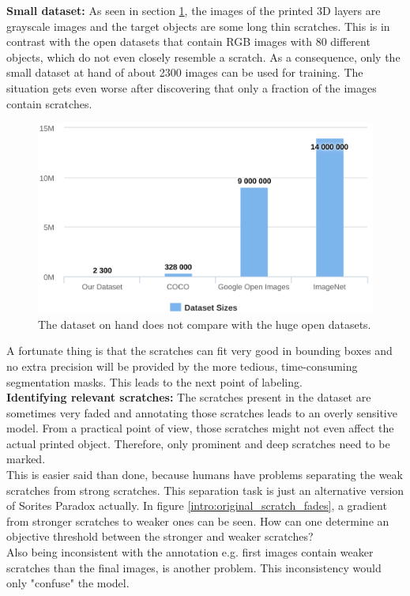 \textbf{Small dataset:}
As seen in section \ref{intro:dataset_sizes}, the images of the printed 3D layers are grayscale images and the target objects are some long thin scratches. This is in contrast with the open datasets that contain RGB images with 80 different objects, which do not even closely resemble a scratch. As a consequence, only the small dataset at hand of about 2300 images can be used for training. The situation gets even worse after discovering that only a fraction of the images contain scratches. \\
\begin{figure}[!h]
\centering
\includegraphics[width=0.4\columnwidth]{images/introduction/dataset_sizes}
\caption{The dataset on hand does not compare with the huge open datasets.}
\label{intro:dataset_sizes}
\end{figure}
A fortunate thing is that the scratches can fit very good in bounding boxes and no extra precision will be provided by the more tedious, time-consuming segmentation masks. This leads to the next point of labeling. \\



\textbf{Identifying relevant scratches:}
The scratches present in the dataset are sometimes very faded and annotating those scratches leads to an overly sensitive model. From a practical point of view, those scratches might not even affect the actual printed object. Therefore, only prominent and deep scratches need to be marked. \\
This is easier said than done, because humans have problems separating the weak scratches from strong scratches. This separation task is just an alternative version of Sorites Paradox actually. In figure \ref{intro:original_scratch_fades}, a gradient from stronger scratches to weaker ones can be seen. How can one determine an objective threshold between the stronger and weaker scratches? \\
Also being inconsistent with the annotation e.g. first images contain weaker scratches than the final images, is another problem. This inconsistency would only "confuse" the model.

